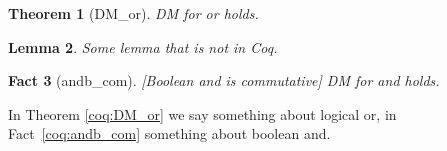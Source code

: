 \documentclass{article}
\theoremstyle{coqtheorem}
\newtheorem{theorem}{Theorem}
\newtheorem{lemma}[theorem]{Lemma}
\newtheorem{fact}[theorem]{Fact}
\begin{document}
\begin{theorem}[DM_or]
  DM for or holds.
\end{theorem}

\begin{lemma}
  Some lemma that is not in Coq.
\end{lemma}

\begin{fact}[andb_com][Boolean and is commutative]
  DM for and holds.
\end{fact}

In Theorem \ref{coq:DM_or} we say something about logical or, in
Fact~\ref{coq:andb_com} something about boolean and.
\end{document}
